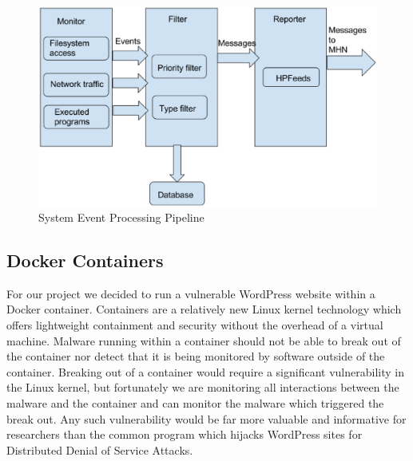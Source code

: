 \documentclass[10pt,conference,draftclsnofoot,onecolumn]{IEEEtran}
\begin{document}
\begin{figure}[!ht]
\includegraphics[scale=0.6]{./architecturediagram.eps}
\caption{System Event Processing Pipeline}
\end{figure}



\subsection{Docker Containers}
For our project we decided to run a vulnerable WordPress website within a Docker container. Containers are a relatively new Linux kernel technology which offers lightweight containment and security without the overhead of a virtual machine. Malware running within a container should not be able to break out of the container nor detect that it is being monitored by software outside of the container. Breaking out of a container would require a significant vulnerability in the Linux kernel, but fortunately we are monitoring all interactions between the malware and the container and can monitor the malware which triggered the break out. Any such vulnerability would be far more valuable and informative for researchers than the common program which hijacks WordPress sites for Distributed Denial of Service Attacks.

%
%
%
%
\end{document}
